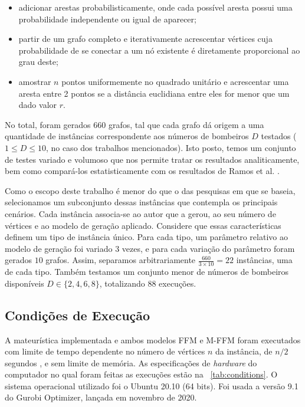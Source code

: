 \documentclass{MO824}
\begin{document}
    \begin{itemize}
        \item adicionar arestas probabilisticamente, onde cada possível aresta possui uma probabilidade independente ou igual de aparecer; \cite{gilbert, erdos}
        \item partir de um grafo completo e iterativamente acrescentar vértices cuja probabilidade de se conectar a um nó existente é diretamente proporcional ao grau deste; \cite{barabasi}
        \item amostrar $n$ pontos uniformemente no quadrado unitário e acrescentar uma aresta entre 2 pontos se a distância euclidiana entre eles for menor que um dado valor $r$.
    \end{itemize}
    
    No total, foram gerados $660$ grafos, tal que cada grafo dá origem a uma quantidade de instâncias correspondente aos números de bombeiros $D$ testados ($1 \leq D \leq 10$, no caso dos trabalhos mencionados). Isto posto, temos um conjunto de testes variado e volumoso que nos permite tratar os resultados analiticamente, bem como compará-los estatisticamente com os resultados de Ramos et al. \cite{natanael}.
    
    Como o escopo deste trabalho é menor do que o das pesquisas em que se baseia, selecionamos um subconjunto dessas instâncias que contempla os principais cenários. Cada instância associa-se ao autor que a gerou, ao seu número de vértices e ao modelo de geração aplicado. Considere que essas características definem um tipo de instância único. Para cada tipo, um parâmetro relativo ao modelo de geração foi variado $3$ vezes, e para cada variação do parâmetro foram gerados $10$ grafos. Assim, separamos arbitrariamente $\frac{660}{3 \times 10} = 22$ instâncias, uma de cada tipo. Também testamos um conjunto menor de números de bombeiros disponíveis $D \in \{2, 4, 6, 8\}$, totalizando $88$ execuções. 
    
    \subsection{Condições de Execução}
    A mateurística implementada e ambos modelos FFM e M-FFM foram executados com limite de tempo dependente no número de vértices $n$ da instância, de $n/2$ segundos \cite{blum}, e sem limite de memória. As especificações de \textit{hardware} do computador no qual foram feitas as execuções estão na \tablename~\ref{tab:conditions}. O sistema operacional utilizado foi o Ubuntu 20.10 (64 bits). Foi usada a versão 9.1 do Gurobi Optimizer, lançada em novembro de 2020.
    
\end{document}
